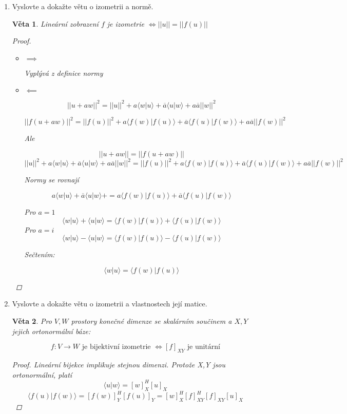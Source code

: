 \documentclass[10pt,a4paper]{article}
\theoremstyle{plain}
\newtheorem{veta}{Věta}
\begin{document}
\begin{enumerate}
\item Vyslovte a dokažte větu o izometrii a normě.

\begin{veta}
Lineární zobrazení $f$ je izometrie $\iff ||u|| = ||f(u)||$ 
\begin{proof}\begin{itemize}
\item $\implies$ 

Vyplývá z definice normy
\item $\impliedby$

\[ ||u + aw||^2 = ||u||^2 + a \langle w|u \rangle + \overline{a}\langle u | w \rangle + a\overline{a} ||w||^2 \]

\[ ||f(u + aw)||^2 = ||f(u)||^2 + a \langle f(w)|f(u) \rangle + \overline{a}\langle f(u)| f(w) \rangle + a\overline{a} ||f(w)||^2 \]

Ale 

\[ ||u + aw|| = ||f(u + aw)|| \]
\[ ||u||^2 + a \langle w|u \rangle + \overline{a}\langle u | w \rangle + a\overline{a} ||w||^2 = ||f(u)||^2 + a \langle f(w)|f(u) \rangle + \overline{a}\langle f(u)| f(w) \rangle + a\overline{a} ||f(w)||^2  \]

Normy se rovnají

\[  a \langle w|u \rangle + \overline{a}\langle u | w \rangle +  =  a \langle f(w)|f(u) \rangle + \overline{a}\langle f(u)| f(w) \rangle \]

Pro $a = 1$
\[  \langle w|u \rangle + \langle u | w \rangle   =   \langle f(w)|f(u) \rangle + \langle f(u)| f(w) \rangle \]
Pro $a = i$
\[  \langle w|u \rangle -\langle u | w \rangle  =   \langle f(w)|f(u) \rangle -\langle f(u)| f(w) \rangle \]

Sečtením:

\[  \langle w|u \rangle   =   \langle f(w)|f(u) \rangle  \]
\end{itemize}\end{proof}
\end{veta}

\item Vyslovte a dokažte větu o izometrii a vlastnostech její matice.
\begin{veta}
Pro $V,W$ prostory konečné dimenze se skalárním součinem a $X,Y$ jejich ortonormální báze:

\[ f: V \to W \text{ je bijektivní izometrie } \iff [f]_{XY} \text{ je unitární}\]
\begin{proof}
Lineární bijekce implikuje stejnou dimenzi. Protože X,Y jsou ortonormální, platí
\[ \langle u | w \rangle = [w]_X^H[u]_X\]
\[ \langle f(u) | f(w) \rangle = [f(w)]_Y^H[f(u)]_Y = [w]^H_X[f]^H_{XY}[f]_{XY}[u]_X\]


\end{proof}
\end{veta}
\end{enumerate}
\end{document}
